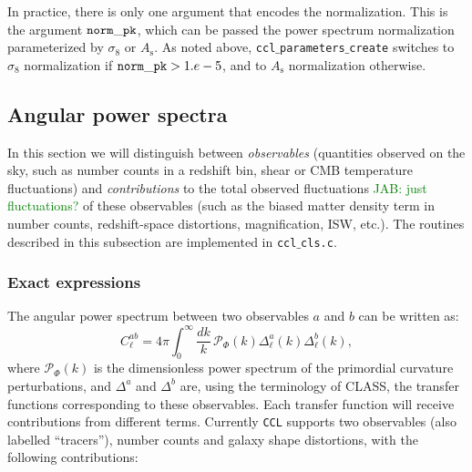 \documentclass[\docopts]{\docclass}
\newcommand{\jab}[1]{\textcolor{green}{JAB: #1}}
\begin{document}
In practice, there is only one argument that encodes the normalization. This is the argument ${\tt norm\_pk}$, which can be passed the power spectrum normalization parameterized by $\sigma_8$ or $A_\mathrm{s}$. As noted above, {\tt ccl$\_$parameters$\_$create} switches to $\sigma_8$ normalization if ${\tt norm\_pk} > 1.e-5$, and to $A_{\mathrm s}$ normalization otherwise.

\subsection{Angular power spectra}
\label{sec:cl}

In this section we will distinguish between {\sl observables} (quantities observed on the sky, such as number counts in a redshift bin, shear or CMB temperature fluctuations) and {\sl contributions} to the total observed fluctuations \jab{just fluctuations?} of these observables (such as the biased matter density term in number counts, redshift-space distortions, magnification, ISW, etc.).
The routines described in this subsection are implemented in {\tt ccl$\_$cls.c}.

\subsubsection{Exact expressions}
The angular power spectrum between two observables $a$ and $b$ can be written as:
\begin{equation}
 C^{ab}_\ell=4\pi\int_0^\infty \frac{dk}{k}\,\mathcal{P}_\Phi(k)\Delta^a_\ell(k)\Delta^b_\ell(k),
\end{equation}
where $\mathcal{P}_\Phi(k)$ is the dimensionless power spectrum of the primordial curvature perturbations, and $\Delta^a$ and $\Delta^b$ are, using the terminology of CLASS, the transfer functions corresponding to these observables. Each transfer function will receive contributions from different terms. Currently {\tt CCL} supports two observables (also labelled ``tracers''), number counts and galaxy shape distortions, with the following contributions:
\end{document}
